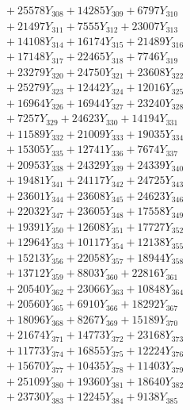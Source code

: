 \documentclass[a4paper,10pt]{article}
\begin{document}
{\begin{align}
&\;  + 25578 Y_{308} + 14285 Y_{309} + 6797 Y_{310} \\[0.3ex]
&\;  + 21497 Y_{311} + 7555 Y_{312} + 23007 Y_{313} \\[0.3ex]
&\;  + 14108 Y_{314} + 16174 Y_{315} + 21489 Y_{316} \\[0.3ex]
&\;  + 17148 Y_{317} + 22465 Y_{318} + 7746 Y_{319} \\[0.3ex]
&\;  + 23279 Y_{320} + 24750 Y_{321} + 23608 Y_{322} \\[0.3ex]
&\;  + 25279 Y_{323} + 12442 Y_{324} + 12016 Y_{325} \\[0.3ex]
&\;  + 16964 Y_{326} + 16944 Y_{327} + 23240 Y_{328} \\[0.5ex]\allowbreak
&\;  + 7257 Y_{329} + 24623 Y_{330} + 14194 Y_{331} \\[0.3ex]
&\;  + 11589 Y_{332} + 21009 Y_{333} + 19035 Y_{334} \\[0.3ex]
&\;  + 15305 Y_{335} + 12741 Y_{336} + 7674 Y_{337} \\[0.3ex]
&\;  + 20953 Y_{338} + 24329 Y_{339} + 24339 Y_{340} \\[0.3ex]
&\;  + 19481 Y_{341} + 24117 Y_{342} + 24725 Y_{343} \\[0.3ex]
&\;  + 23601 Y_{344} + 23608 Y_{345} + 24623 Y_{346} \\[0.3ex]
&\;  + 22032 Y_{347} + 23605 Y_{348} + 17558 Y_{349} \\[0.3ex]
&\;  + 19391 Y_{350} + 12608 Y_{351} + 17727 Y_{352} \\[0.3ex]
&\;  + 12964 Y_{353} + 10117 Y_{354} + 12138 Y_{355} \\[0.3ex]
&\;  + 15213 Y_{356} + 22058 Y_{357} + 18944 Y_{358} \\[0.5ex]\allowbreak
&\;  + 13712 Y_{359} + 8803 Y_{360} + 22816 Y_{361} \\[0.3ex]
&\;  + 20540 Y_{362} + 23066 Y_{363} + 10848 Y_{364} \\[0.3ex]
&\;  + 20560 Y_{365} + 6910 Y_{366} + 18292 Y_{367} \\[0.3ex]
&\;  + 18096 Y_{368} + 8267 Y_{369} + 15189 Y_{370} \\[0.3ex]
&\;  + 21674 Y_{371} + 14773 Y_{372} + 23168 Y_{373} \\[0.3ex]
&\;  + 11773 Y_{374} + 16855 Y_{375} + 12224 Y_{376} \\[0.3ex]
&\;  + 15670 Y_{377} + 10435 Y_{378} + 11403 Y_{379} \\[0.3ex]
&\;  + 25109 Y_{380} + 19360 Y_{381} + 18640 Y_{382} \\[0.3ex]
&\;  + 23730 Y_{383} + 12245 Y_{384} + 9138 Y_{385} \\[0.3ex]

\end{align}}
\end{document}
